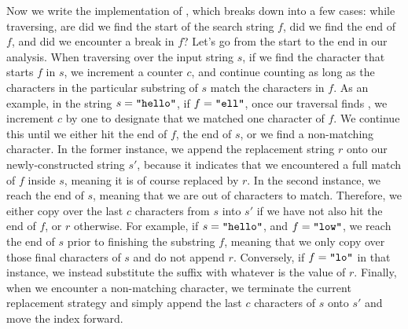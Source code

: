 Now we write the implementation of , which breaks down into a few cases: while traversing, are did we find the start of the search string $f$, did we find the end of $f$, and did we encounter a break in $f$? Let's go from the start to the end in our analysis. When traversing over the input string $s$, if we find the character that starts $f$ in $s$, we increment a counter $c$, and continue counting as long as the characters in the particular substring of $s$ match the characters in $f$. As an example, in the string $s=\texttt{"hello"}$, if $f=\texttt{"ell"}$, once our traversal finds , we increment $c$ by one to designate that we matched one character of $f$. We continue this until we either hit the end of $f$, the end of $s$, or we find a non-matching character. In the former instance, we append the replacement string $r$ onto our newly-constructed string $s'$, because it indicates that we encountered a full match of $f$ inside $s$, meaning it is of course replaced by $r$. In the second instance, we reach the end of $s$, meaning that we are out of characters to match. Therefore, we either copy over the last $c$ characters from $s$ into $s'$ if we have not also hit the end of $f$, or $r$ otherwise. For example, if $s=\texttt{"hello"}$, and $f=\texttt{"low"}$, we reach the end of $s$ prior to finishing the substring $f$, meaning that we only copy over those final characters of $s$ and do not append $r$. Conversely, if $f=\texttt{"lo"}$ in that instance, we instead substitute the suffix  with whatever is the value of $r$. Finally, when we encounter a non-matching character, we terminate the current replacement strategy and simply append the last $c$ characters of $s$ onto $s'$ and move the index forward.


